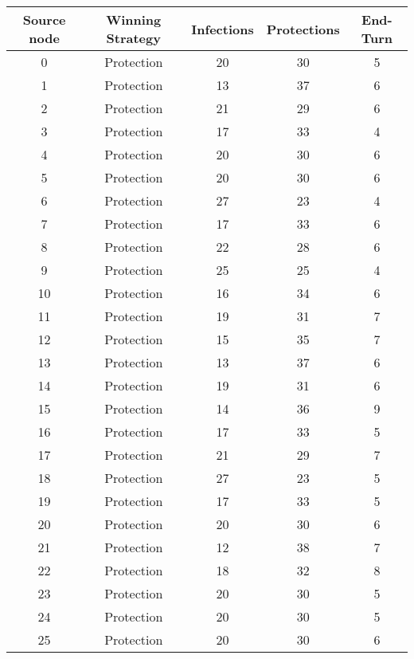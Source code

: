 \documentclass[results.tex]{subfiles}
\begin{document}
\begin{center}
  \begin{tabular}{| c || c | c | c | c |}
    \hline
    {\bfseries Source node} & {\bfseries Winning Strategy} & {\bfseries Infections} & {\bfseries Protections} & {\bfseries End-Turn} \\  %
    \hline\hline
    0 & Protection & 20 & 30 & 5 \\ 
    \hline
    1 & Protection & 13 & 37 & 6 \\ 
    \hline
    2 & Protection & 21 & 29 & 6 \\ 
    \hline
    3 & Protection & 17 & 33 & 4 \\ 
    \hline
    4 & Protection & 20 & 30 & 6 \\ 
    \hline
    5 & Protection & 20 & 30 & 6 \\ 
    \hline
    6 & Protection & 27 & 23 & 4 \\ 
    \hline
    7 & Protection & 17 & 33 & 6 \\ 
    \hline
    8 & Protection & 22 & 28 & 6 \\ 
    \hline
    9 & Protection & 25 & 25 & 4 \\ 
    \hline
    10 & Protection & 16 & 34 & 6 \\ 
    \hline
    11 & Protection & 19 & 31 & 7 \\ 
    \hline
    12 & Protection & 15 & 35 & 7 \\ 
    \hline
    13 & Protection & 13 & 37 & 6 \\ 
    \hline
    14 & Protection & 19 & 31 & 6 \\ 
    \hline
    15 & Protection & 14 & 36 & 9 \\ 
    \hline
    16 & Protection & 17 & 33 & 5 \\ 
    \hline
    17 & Protection & 21 & 29 & 7 \\ 
    \hline
    18 & Protection & 27 & 23 & 5 \\ 
    \hline
    19 & Protection & 17 & 33 & 5 \\ 
    \hline
    20 & Protection & 20 & 30 & 6 \\ 
    \hline
    21 & Protection & 12 & 38 & 7 \\ 
    \hline
    22 & Protection & 18 & 32 & 8 \\ 
    \hline
    23 & Protection & 20 & 30 & 5 \\ 
    \hline
    24 & Protection & 20 & 30 & 5 \\ 
    \hline
    25 & Protection & 20 & 30 & 6 \\ 

\end{tabular}
\end{center}
\end{document}
